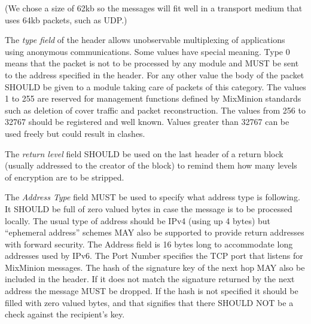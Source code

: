 \documentclass{article}
\begin{document}
(We chose a size of 62kb so the messages will fit well in a transport
medium that uses 64kb packets, such as UDP.)

% 

The \emph{type field} of the header allows unobservable multiplexing of
applications using anonymous communications. Some values have special
meaning. Type 0 means that the packet is not to be processed by any
module and MUST be sent to the address specified in the header. For
any other value the body of the packet SHOULD be given to a module taking
care of packets of this category. The values 1 to 255 are reserved for
management functions defined by MixMinion standards such as deletion
of cover traffic and packet reconstruction. The values from 256 to
32767 should be registered and well known. Values greater than 32767
can be used freely but could result in clashes.

% 

The \emph{return level} field SHOULD be used on the last header of a
return block (usually addressed to the creator of the block) to remind
them how many levels of encryption are to be stripped.

The \emph{Address Type} field MUST be used to specify what address type is
following. It SHOULD be full of zero valued bytes in case the message
is to be processed locally. The usual type of address should be IPv4
(using up 4 bytes) but ``ephemeral address'' schemes MAY also be
supported to provide return addresses with forward security. The
Address field is 16 bytes long to accommodate long addresses used by
IPv6. The Port Number specifies the TCP port that listens for
MixMinion messages. The hash of the signature key of the next hop MAY
also be included in the header. If it does not match the signature
returned by the next address the message MUST be dropped. If the hash
is not specified it should be filled with zero valued bytes, and that
signifies that there SHOULD NOT be a check against the recipient's key.
\end{document}
